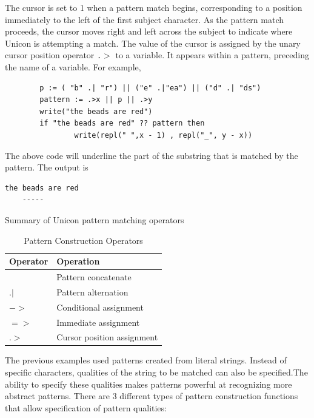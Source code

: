 \documentclass[letterpaper,12pt]{article}
\begin{document}
The cursor is set to 1 when a pattern match begins, corresponding to a
position immediately to the left of the first subject character. As
the pattern match proceeds, the cursor moves right and left across the
subject to indicate where Unicon is attempting a match. The value of
the cursor is assigned by the unary cursor position operator
\texttt{.$>$} to a variable. It appears within a pattern, preceding the
name of a variable. For example,

\begin{verbatim}
        p := ( "b" .| "r") || ("e" .|"ea") || ("d" .| "ds")
        pattern := .>x || p || .>y
        write("the beads are red")
        if "the beads are red" ?? pattern then 
                write(repl(" ",x - 1) , repl("_", y - x))
\end{verbatim}

The above code will underline the part of the substring that is
matched by the pattern. The output is

\begin{verbatim}
the beads are red
    -----
\end{verbatim}

Summary of Unicon pattern matching operators
\begin{table}[h]
\begin{center}
	{\begin{tabular}{ | l | l | } \hline 
	Operator & Operation \\ \hline
	\textbar\textbar & Pattern concatenate \\
	\(.|\) & Pattern alternation \\
	\(-\!\!>\) & Conditional assignment \\
	$=>$ & Immediate assignment \\
	$.>$ & Cursor position assignment \\
	\hline
	\end{tabular}}
 	\caption{Pattern Construction Operators}
	\label{Table 1: Pattern Construction Operators}
\end{center}
\end{table}

The previous examples used patterns created from literal
strings. Instead of specific characters, qualities of the string to be
matched can also be specified.The ability to specify these qualities
makes patterns powerful at recognizing more abstract patterns. There
are 3 different types of pattern construction functions that allow
specification of pattern qualities:
\end{document}
